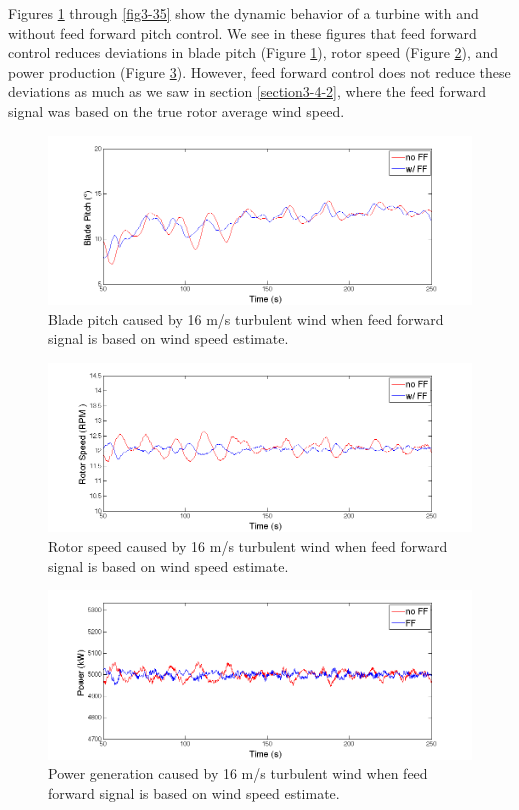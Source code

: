 Figures \ref{fig3-31} through \ref{fig3-35} show the dynamic behavior of a turbine with and without feed forward pitch control. We see in these figures that feed forward control reduces deviations in blade pitch (Figure \ref{fig3-31}), rotor speed (Figure \ref{fig3-32}), and power production (Figure \ref{fig3-33}). However, feed forward control does not reduce these deviations as much as we saw in section \ref{section3-4-2}, where the feed forward signal was based on the true rotor average wind speed. 

\begin{figure}[htb]
	\centering
		\includegraphics[width = \linewidth]{Figures/ch3Figures/fig3-31.png}
		
	\caption{Blade pitch caused by 16 m/s turbulent wind when feed forward signal is based on wind speed estimate.}
	\label{fig3-31}
\end{figure}

\begin{figure}[hb]
	\centering
		\includegraphics[width = \linewidth]{Figures/ch3Figures/fig3-32.png}
		
	\caption{Rotor speed caused by 16 m/s turbulent wind when feed forward signal is based on wind speed estimate.}
	\label{fig3-32}
\end{figure}

\begin{figure}[hb]
	\centering
		\includegraphics[width = \linewidth]{Figures/ch3Figures/fig3-33.png}
		
	\caption{Power generation caused by 16 m/s turbulent wind when feed forward signal is based on wind speed estimate.}
	\label{fig3-33}
\end{figure}


